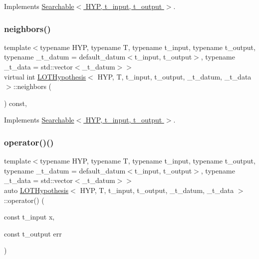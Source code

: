 Implements \hyperlink{class_searchable_a64bda92cc9314dae7aff31f4444a93e6}{Searchable$<$ H\+Y\+P, t\+\_\+input, t\+\_\+output $>$}.

\mbox{\label{class_l_o_t_hypothesis_a9716b492f5d05d6f008264bca4a4445f}} 
\subsubsection{\texorpdfstring{neighbors()}{neighbors()}}
{\footnotesize\ttfamily template$<$typename H\+YP, typename T, typename t\+\_\+input, typename t\+\_\+output, typename \+\_\+t\+\_\+datum = default\+\_\+datum$<$t\+\_\+input, t\+\_\+output$>$, typename \+\_\+t\+\_\+data = std\+::vector$<$\+\_\+t\+\_\+datum$>$$>$ \\
virtual int \hyperlink{class_l_o_t_hypothesis}{L\+O\+T\+Hypothesis}$<$ H\+YP, T, t\+\_\+input, t\+\_\+output, \+\_\+t\+\_\+datum, \+\_\+t\+\_\+data $>$\+::neighbors (\begin{DoxyParamCaption}{ }\end{DoxyParamCaption}) const\hspace{0.3cm}{\ttfamily [inline]}, {\ttfamily [virtual]}}



Implements \hyperlink{class_searchable_a0450c35a21c5940a63560aa24b4ff0cc}{Searchable$<$ H\+Y\+P, t\+\_\+input, t\+\_\+output $>$}.

\mbox{\label{class_l_o_t_hypothesis_ae64a27eeb271316fd76cf26a86fff7e6}} 
\subsubsection{\texorpdfstring{operator()()}{operator()()}}
{\footnotesize\ttfamily template$<$typename H\+YP, typename T, typename t\+\_\+input, typename t\+\_\+output, typename \+\_\+t\+\_\+datum = default\+\_\+datum$<$t\+\_\+input, t\+\_\+output$>$, typename \+\_\+t\+\_\+data = std\+::vector$<$\+\_\+t\+\_\+datum$>$$>$ \\
auto \hyperlink{class_l_o_t_hypothesis}{L\+O\+T\+Hypothesis}$<$ H\+YP, T, t\+\_\+input, t\+\_\+output, \+\_\+t\+\_\+datum, \+\_\+t\+\_\+data $>$\+::operator() (\begin{DoxyParamCaption}\item[{const t\+\_\+input}]{x,  }\item[{const t\+\_\+output}]{err }\end{DoxyParamCaption})\hspace{0.3cm}{\ttfamily [inline]}}

